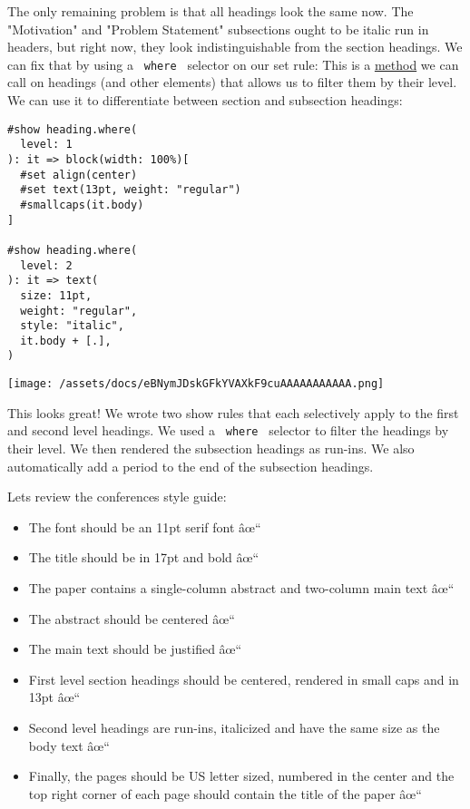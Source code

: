 The only remaining problem is that all headings look the same now. The
"Motivation" and "Problem Statement" subsections ought to be italic run
in headers, but right now, they look indistinguishable from the section
headings. We can fix that by using a \texttt{\ where\ } selector on our
set rule: This is a \href{/docs/reference/scripting/\#methods}{method}
we can call on headings (and other elements) that allows us to filter
them by their level. We can use it to differentiate between section and
subsection headings:

\begin{verbatim}
#show heading.where(
  level: 1
): it => block(width: 100%)[
  #set align(center)
  #set text(13pt, weight: "regular")
  #smallcaps(it.body)
]

#show heading.where(
  level: 2
): it => text(
  size: 11pt,
  weight: "regular",
  style: "italic",
  it.body + [.],
)
\end{verbatim}

\texttt{[image: /assets/docs/eBNymJDskGFkYVAXkF9cuAAAAAAAAAAA.png]}

This looks great! We wrote two show rules that each selectively apply to
the first and second level headings. We used a \texttt{\ where\ }
selector to filter the headings by their level. We then rendered the
subsection headings as run-ins. We also automatically add a period to
the end of the subsection headings.

Let\textquotesingle s review the conference\textquotesingle s style
guide:

\begin{itemize}
\tightlist
\item
  The font should be an 11pt serif font âœ``
\item
  The title should be in 17pt and bold âœ``
\item
  The paper contains a single-column abstract and two-column main text
  âœ``
\item
  The abstract should be centered âœ``
\item
  The main text should be justified âœ``
\item
  First level section headings should be centered, rendered in small
  caps and in 13pt âœ``
\item
  Second level headings are run-ins, italicized and have the same size
  as the body text âœ``
\item
  Finally, the pages should be US letter sized, numbered in the center
  and the top right corner of each page should contain the title of the
  paper âœ``
\end{itemize}

